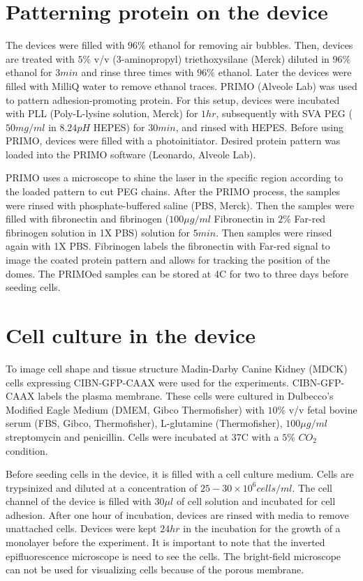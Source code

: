 \section{Patterning protein on the device}
The devices were filled with $96\%$ ethanol for removing air bubbles. Then, devices are treated with $5\%$ v/v (3-aminopropyl) triethoxysilane (Merck) diluted in $96\%$ ethanol for $3min$ and rinse three times with $96\%$ ethanol. Later the devices were filled with MilliQ water to remove ethanol traces. PRIMO (Alveole Lab) was used to pattern adhesion-promoting protein. For this setup, devices were incubated with PLL (Poly-L-lysine solution, Merck) for $1hr$, subsequently with SVA PEG ($50mg/ml$ in $8.24pH$ HEPES) for $30min$, and rinsed with HEPES. Before using PRIMO, devices were filled with a photoinitiator. Desired protein pattern was loaded into the PRIMO software (Leonardo, Alveole Lab). 

PRIMO uses a microscope to shine the laser in the specific region according to the loaded pattern to cut PEG chains. After the PRIMO process, the samples were rinsed with phosphate-buffered saline (PBS, Merck). Then the samples were filled with fibronectin and fibrinogen ($100\mu g/ml$ Fibronectin in $2\%$ Far-red fibrinogen solution in 1X PBS) solution for $5 min$. Then samples were rinsed again with 1X PBS. Fibrinogen labels the fibronectin with Far-red signal to image the coated protein pattern and allows for tracking the position of the domes. The PRIMOed samples can be stored at 4\textdegree{}C for two to three days before seeding cells.

\section{Cell culture in the device}

To image cell shape and tissue structure Madin-Darby Canine Kidney (MDCK) cells expressing CIBN-GFP-CAAX were used for the experiments. CIBN-GFP-CAAX labels the plasma membrane. These cells were cultured in Dulbecco’s Modified Eagle Medium (DMEM, Gibco Thermofisher) with $10\%$ v/v fetal bovine serum (FBS, Gibco, Thermofisher), L-glutamine (Thermofisher), $100\mu g/ml$ streptomycin and penicillin. Cells were incubated at  37\textdegree{}C with a $5\%$ $CO_2$ condition. 

Before seeding cells in the device, it is filled with a cell culture medium. Cells are trypsinized and diluted at a concentration of $25-30\times10^6 cells/ml$. The cell channel of the device is filled with $30\mu l$ of cell solution and incubated for cell adhesion. After one hour of incubation, devices are rinsed with media to remove unattached cells. Devices were kept $24hr$ in the incubation for the growth of a monolayer before the experiment. It is important to note that the inverted epifluorescence microscope is need to see the cells. The bright-field microscope can not be used for visualizing cells because of the porous membrane.

